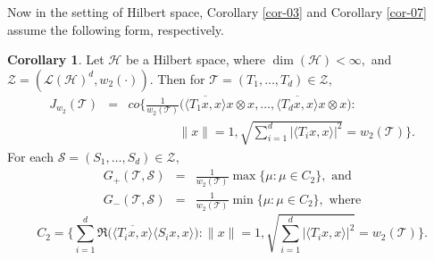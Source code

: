\documentclass{amsart}
\theoremstyle{definition}
\newtheorem{cor}[theorem]{Corollary}
\theoremstyle{remark}
\numberwithin{equation}{section}
\begin{document}
Now in the setting of Hilbert space, Corollary \ref{cor-03} and Corollary \ref{cor-07} assume the following form, respectively.
\begin{cor}\label{cor-04}\cite[Th. 1.1]{GS}
	Let $\mathcal{H}$ be a Hilbert space, where $\dim(\mathcal{H})<\infty,$ and $\mathcal{Z}=(\mathcal{L}(\mathcal{H})^d,w_2(\cdot)).$ Then for $\mathcal{T}=(T_1,\ldots,T_d)\in \mathcal{Z},$ 
	\begin{eqnarray*}
		J_{w_2}(\mathcal{T})
		&=&co\bigg\{\frac{1}{w_2(\mathcal{T})}\bigg(\overline{\langle T_1x,x\rangle}x\otimes x,\ldots,\overline{\langle T_dx,x\rangle }x\otimes x\bigg): \\
		&& \quad \quad \quad \quad \|x\|=1, \sqrt{\sum_{i=1}^d|\langle T_ix,x\rangle|^2}=w_2(\mathcal{T})\bigg\}.
	\end{eqnarray*}
	For each $\mathcal{S}=(S_1,\ldots,S_d) \in \mathcal{Z},$ 
	\begin{eqnarray*}
	G_+(\mathcal{T},\mathcal{S})
	&=&\frac{1}{w_2(\mathcal{T})}\max\{\mu:\mu\in C_2\}, \text{ and }\\
	G_-(\mathcal{T},\mathcal{S})
	&=&\frac{1}{w_2(\mathcal{T})}\min\{\mu:\mu\in C_2\}, \text{ where}
\end{eqnarray*}
\[C_2=\bigg\{\sum_{i=1}^d\Re\bigg(\overline{\langle T_ix,x\rangle}\langle S_ix,x\rangle \bigg): \|x\|=1, \sqrt{\sum_{i=1}^d|\langle T_ix,x\rangle|^2}=w_2(\mathcal{T})\bigg\}.\]
\end{cor}
\end{document}
